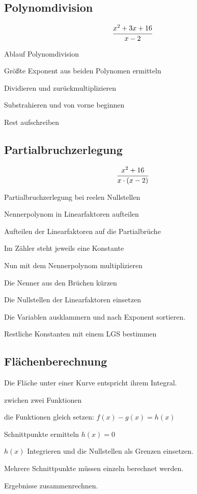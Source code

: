 \documentclass[german]{latex4ei/latex4ei_sheet}
\begin{document}
\begin{sectionbox}


 \subsection{Polynomdivision}
    \begin{align*}
        \cfrac{x^2+3x+16}{x-2}
    \end{align*}
    \begin{cookbox}{Ablauf Polynomdivision}
     \item Größte Exponent aus beiden Polynomen ermitteln
     \item Dividieren und zurückmultiplizieren
     \item Substrahieren und von vorne beginnen
     \item Rest aufschreiben
    \end{cookbox}
    

 \subsection{Partialbruchzerlegung}
    \begin{align*}
        \cfrac{x^2+16}{x\cdot (x-2)}
    \end{align*}
    \begin{cookbox}{Partialbruchzerlegung bei reelen Nullstellen}
     \item Nennerpolynom in Linearfaktoren aufteilen
     \item Aufteilen der Linearfaktoren auf die Partialbrüche
     \item Im Zähler steht jeweils eine Konstante
     \item Nun mit dem Nennerpolynom multiplizieren
     \item Die Nenner aus den Brüchen kürzen
     \item Die Nullstellen der Linearfaktoren einsetzen
     \item Die Variablen ausklammern und nach Exponent sortieren.
     \item Restliche Konstanten mit einem LGS bestimmen
    \end{cookbox}

 \subsection{Flächenberechnung}
    Die Fläche unter einer Kurve entspricht ihrem Integral. 
    \begin{cookbox}{zwichen zwei Funktionen}
        \item die Funktionen gleich setzen: $f(x) - g(x) = h(x)$ 
        \item Schnittpunkte ermitteln $h(x) = 0$
        \item $h(x)$ Integrieren und die Nullstellen als Grenzen einsetzen.
        \item Mehrere Schnittpunkte müssen einzeln berechnet werden.
        \item Ergebnisse zusammenrechnen.
    \end{cookbox}
    


\end{sectionbox}
\end{document}
